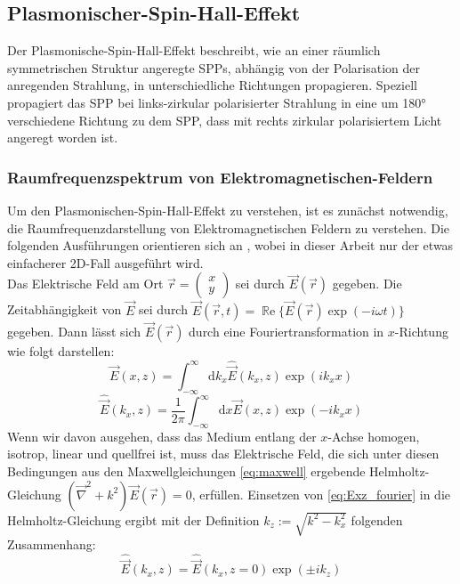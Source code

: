 \documentclass{article}
\begin{document}
	\subsection{Plasmonischer-Spin-Hall-Effekt}
	Der Plasmonische-Spin-Hall-Effekt beschreibt, wie an einer räumlich symmetrischen Struktur angeregte SPPs, abhängig von der Polarisation der anregenden Strahlung, in unterschiedliche Richtungen propagieren. Speziell propagiert das SPP bei links-zirkular polarisierter Strahlung in eine um 180° verschiedene Richtung zu dem SPP, dass mit rechts zirkular polarisiertem Licht angeregt worden ist. 
	\subsubsection{Raumfrequenzspektrum von Elektromagnetischen-Feldern}
		Um den Plasmonischen-Spin-Hall-Effekt zu verstehen, ist es zunächst notwendig, die Raumfrequenzdarstellung von Elektromagnetischen Feldern zu verstehen. Die folgenden Ausführungen orientieren sich an \cite{Novotny.2012b}, wobei in dieser Arbeit nur der etwas einfacherer 2D-Fall ausgeführt wird.\\		
		Das Elektrische Feld am Ort $\vec{r} = \begin{pmatrix} x \\ y \end{pmatrix} $ sei durch $\vec{E}({\vec{r}})$ gegeben.
		Die Zeitabhängigkeit von $\vec{E}$ sei durch $\vec{E}({\vec{r}, t})=\operatorname{\mathbb{R}e}\{\vec{E}({\vec{r}})\exp(-i\omega t)\}$ gegeben. Dann lässt sich $\vec{E}({\vec{r}})$ durch eine Fouriertransformation in $x$-Richtung wie folgt darstellen:
		\begin{equation}
			\label{eq:Exz_fourier}
			\vec{E}(x,z) = \int_{-\infty}^{\infty}\mathrm{d}{k_x}\hat{\vec{E}}(k_x,z)\exp(ik_xx)				
		\end{equation}
		\begin{equation}
			\label{eq:EKxz_fourier}
			\hat{\vec{E}}(k_x,z) = \dfrac{1}{2\pi}\int_{-\infty}^{\infty}\mathrm{d}x\vec{E}(x,z)\exp(-ik_xx)
		\end{equation}
		Wenn wir davon ausgehen, dass das Medium entlang der $x$-Achse homogen, isotrop, linear und quellfrei ist, muss das Elektrische Feld, die sich unter diesen Bedingungen aus den Maxwellgleichungen \eqref{eq:maxwell} ergebende Helmholtz-Gleichung $(\vec{\nabla}^2+k^2)\vec{E}({\vec{r}}) = 0$, erfüllen. Einsetzen von \eqref{eq:Exz_fourier} in die Helmholtz-Gleichung ergibt mit der Definition $k_z := \sqrt{k^2-k_x^2}$ folgenden Zusammenhang:
		\begin{equation}
			\label{eq:spatial_spektrum}
		\hat{\vec{E}}(k_x,z) =\hat{\vec{E}}(k_x,z= 0) \exp(\pm ik_ z)
		\end{equation}
\end{document}
